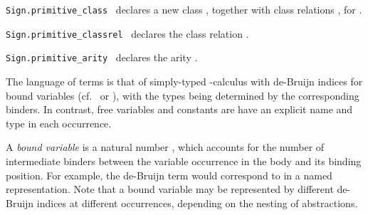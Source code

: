 \begin{isabellebody}
\begin{isamarkuptext}
\begin{description}
  \item \verb|Sign.primitive_class|~ declares a new class , together with class
  relations , for .

  \item \verb|Sign.primitive_classrel|~ declares the class relation .

  \item \verb|Sign.primitive_arity|~ declares
  the arity .

  \end{description}%
\end{isamarkuptext}%
\isamarkuptrue%
%
\endisatagmlref
{\isafoldmlref}%
%
\isadelimmlref
%
\endisadelimmlref
%
\isamarkuptrue%
%
\begin{isamarkuptext}%
The language of terms is that of simply-typed \isa{{\isasymlambda}}-calculus
  with de-Bruijn indices for bound variables (cf.\ \cite{debruijn72}
  or \cite{paulson-ml2}), with the types being determined by the
  corresponding binders.  In contrast, free variables and constants
  are have an explicit name and type in each occurrence.

  \medskip A \emph{bound variable} is a natural number ,
  which accounts for the number of intermediate binders between the
  variable occurrence in the body and its binding position.  For
  example, the de-Bruijn term  would
  correspond to  in a named
  representation.  Note that a bound variable may be represented by
  different de-Bruijn indices at different occurrences, depending on
  the nesting of abstractions.


\end{isamarkuptext}
\end{isabellebody}
